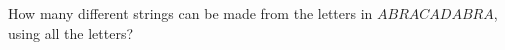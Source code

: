 \documentclass[../main.tex]{subfiles}
\begin{document}
How many different strings can be made from the letters in $ABRACADABRA$, using all the letters?

\solution
\end{document}

